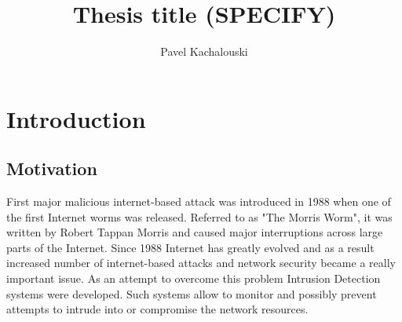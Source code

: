 \documentclass[thesis=M,english]{FITthesis}[2011/07/15]
\title{Thesis title (SPECIFY)}
\author{Pavel Kachalouski} %
\begin{document}

\chapter{Introduction}
\section{Motivation}
First major malicious internet-based attack was introduced in 1988 when one of the first Internet worms was released. Referred to as "The Morris Worm", it was written by Robert Tappan Morris and caused major interruptions across large parts of the Internet. Since 1988 Internet has greatly evolved and as a result increased number of internet-based attacks and network security became a really important issue. As an attempt to overcome this problem Intrusion Detection systems were developed. Such systems allow to monitor and possibly prevent attempts to intrude into or compromise the network resources.
\end{document}
